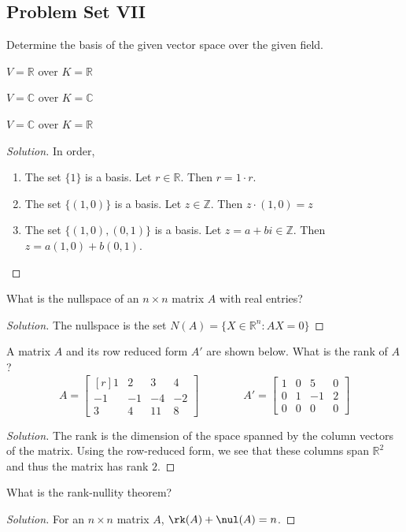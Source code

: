 \documentclass[crop=false,class=book]{standalone}
\begin{document}
\subsection{Problem Set VII}
\begin{problem}
Determine the basis of the given vector space over the given field.
\begin{enumerate}
\begin{multicols}{3}
    \item $V=\mathbb{R}$ over $K=\mathbb{R}$
    \item $V=\mathbb{C}$ over $K=\mathbb{C}$
    \item $V=\mathbb{C}$ over $K=\mathbb{R}$
\end{multicols}
\end{enumerate}
\end{problem}
\begin{proof}[Solution]
In order,
\begin{enumerate}
    \item The set $\{1\}$ is a basis. Let $r \in \mathbb{R}$. Then $r=1\cdot r$.
    \item The set $\{(1,0)\}$ is a basis. Let $z\in \mathbb{Z}$. Then $z\cdot(1,0) = z$
    \item The set $\{(1,0),(0,1)\}$ is a basis. Let $z=a+bi\in \mathbb{Z}$. Then $z = a(1,0)+b(0,1)$.
\end{enumerate}
\end{proof}
\begin{problem}
What is the nullspace of an $n\times n$ matrix $A$ with real entries?
\end{problem}
\begin{proof}[Solution]
The nullspace is the set $N(A) = \{X\in \mathbb{R}^n: AX = 0\}$
\end{proof}
\begin{problem}
A matrix $A$ and its row reduced form $A'$ are shown below. What is the rank of $A$?
\begin{equation*}
    A=\begin{bmatrix*}[r] 1 & 2 & 3 & 4 \\ -1 & -1 & -4 & -2 \\ 3 & 4 & 11 & 8 \end{bmatrix*} \quad\quad\quad\quad A' = \begin{bmatrix} 1 & 0 & 5 & 0 \\ 0 & 1 & -1 & 2 \\ 0 & 0 & 0 & 0 \end{bmatrix}
\end{equation*}
\end{problem}
\begin{proof}[Solution]
The rank is the dimension of the space spanned by the column vectors of the matrix. Using the row-reduced form, we see that these columns span $\mathbb{R}^2$ and thus the matrix has rank $2$.
\end{proof}
\begin{problem}
What is the rank-nullity theorem?
\end{problem}
\begin{proof}[Solution]
For an $n\times n$ matrix $A$, $\rk(A)+\nul(A) = n$.
\end{proof}
\newpage
\end{document}
